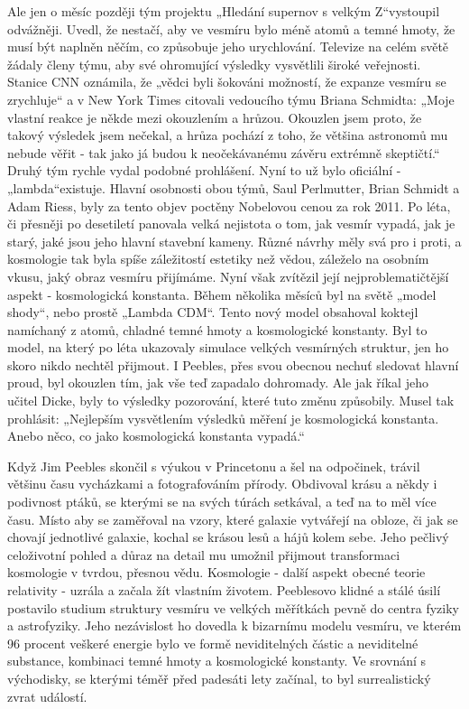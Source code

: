   Ale jen o měsíc později tým projektu „Hledání supernov s velkým Z“vystoupil odvážněji. Uvedl, že
  nestačí, aby ve vesmíru bylo méně atomů a temné hmoty, že musí být naplněn něčím, co způsobuje
  jeho urychlování. Televize na celém světě žádaly členy týmu, aby své ohromující výsledky
  vysvětlili široké veřejnosti. Stanice CNN oznámila, že „vědci byli šokováni možností, že expanze
  vesmíru se zrychluje“ a v New York Times citovali vedoucího týmu Briana Schmidta: „Moje vlastní
  reakce je někde mezi okouzlením a hrůzou. Okouzlen jsem proto, že takový výsledek jsem nečekal, a
  hrůza pochází z toho, že většina astronomů mu nebude věřit - tak jako já budou k neočekávanému
  závěru extrémně skeptičtí.“ Druhý tým rychle vydal podobné prohlášení. Nyní to už bylo oficiální -
  „lambda“existuje. Hlavní osobnosti obou týmů, Saul Perlmutter, Brian Schmidt a Adam Riess, byly za
  tento objev poctěny Nobelovou cenou za rok 2011. Po léta, či přesněji po desetiletí panovala velká
  nejistota o tom, jak vesmír vypadá, jak je starý, jaké jsou jeho hlavní stavební kameny. Různé
  návrhy měly svá pro i proti, a kosmologie tak byla spíše záležitostí estetiky než vědou, záleželo
  na osobním vkusu, jaký obraz vesmíru přijímáme. Nyní však zvítězil její nejproblematičtější aspekt
  - kosmologická konstanta. Během několika měsíců byl na světě „model shody“, nebo prostě „Lambda
  CDM“. Tento nový model obsahoval koktejl namíchaný z atomů, chladné temné hmoty a kosmologické
  konstanty. Byl to model, na který po léta ukazovaly simulace velkých vesmírných struktur, jen ho
  skoro nikdo nechtěl přijmout. I Peebles, přes svou obecnou nechuť sledovat hlavní proud, byl
  okouzlen tím, jak vše teď zapadalo dohromady. Ale jak říkal jeho učitel Dicke, byly to výsledky
  pozorování, které tuto změnu způsobily. Musel tak prohlásit: „Nejlepším vysvětlením výsledků
  měření je kosmologická konstanta. Anebo něco, co jako kosmologická konstanta vypadá.“
  
  Když Jim Peebles skončil s výukou v Princetonu a šel na odpočinek, trávil většinu času vycházkami
  a fotografováním přírody. Obdivoval krásu a někdy i podivnost ptáků, se kterými se na svých túrách
  setkával, a teď na to měl více času. Místo aby se zaměřoval na vzory, které galaxie vytvářejí na
  obloze, či jak se chovají jednotlivé galaxie, kochal se krásou lesů a hájů kolem sebe. Jeho
  pečlivý celoživotní pohled a důraz na detail mu umožnil přijmout transformaci kosmologie v tvrdou,
  přesnou vědu. Kosmologie - další aspekt obecné teorie relativity - uzrála a začala žít vlastním
  životem. Peeblesovo klidné a stálé úsilí postavilo studium struktury vesmíru ve velkých měřítkách
  pevně do centra fyziky a astrofyziky. Jeho nezávislost ho dovedla k bizarnímu modelu vesmíru, ve
  kterém 96 procent veškeré energie bylo ve formě neviditelných částic a neviditelné substance,
  kombinaci temné hmoty a kosmologické konstanty. Ve srovnání s východisky, se kterými téměř před
  padesáti lety začínal, to byl surrealistický zvrat událostí. 
  
